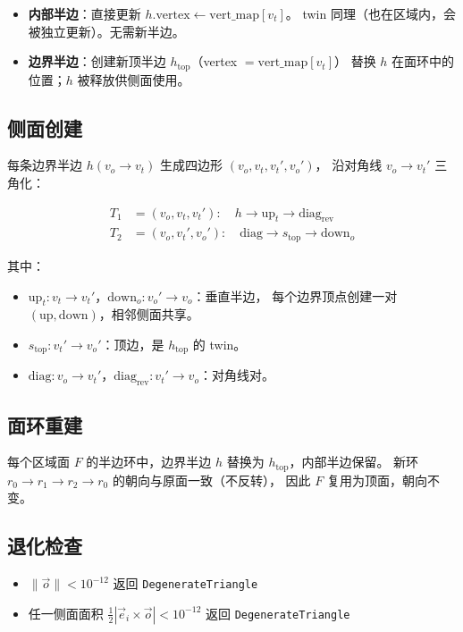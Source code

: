 \documentclass[11pt,a4paper]{article}
\begin{document}
\begin{itemize}
  \item \textbf{内部半边}：直接更新 $h.\text{vertex} \leftarrow \text{vert\_map}[v_t]$。
        twin 同理（也在区域内，会被独立更新）。无需新半边。
  \item \textbf{边界半边}：创建新顶半边 $h_{\text{top}}$（vertex $= \text{vert\_map}[v_t]$）
        替换 $h$ 在面环中的位置；$h$ 被释放供侧面使用。
\end{itemize}

\subsection{侧面创建}

每条边界半边 $h(v_o \to v_t)$ 生成四边形 $(v_o, v_t, v_t', v_o')$，
沿对角线 $v_o \to v_t'$ 三角化：

\begin{align*}
  T_1 &= (v_o, v_t, v_t'):\quad h \to \text{up}_t \to \text{diag}_{\text{rev}} \\
  T_2 &= (v_o, v_t', v_o'):\quad \text{diag} \to s_{\text{top}} \to \text{down}_o
\end{align*}

其中：
\begin{itemize}
  \item $\text{up}_t: v_t \to v_t'$，$\text{down}_o: v_o' \to v_o$：垂直半边，
        每个边界顶点创建一对 $(\text{up}, \text{down})$，相邻侧面共享。
  \item $s_{\text{top}}: v_t' \to v_o'$：顶边，是 $h_{\text{top}}$ 的 twin。
  \item $\text{diag}: v_o \to v_t'$，$\text{diag}_{\text{rev}}: v_t' \to v_o$：对角线对。
\end{itemize}

\subsection{面环重建}

每个区域面 $F$ 的半边环中，边界半边 $h$ 替换为 $h_{\text{top}}$，内部半边保留。
新环 $r_0 \to r_1 \to r_2 \to r_0$ 的朝向与原面一致（不反转），
因此 $F$ 复用为顶面，朝向不变。

\subsection{退化检查}

\begin{itemize}
  \item $\|\vec{o}\| < 10^{-12}$ 返回 \texttt{DegenerateTriangle}
  \item 任一侧面面积 $\frac{1}{2}|\vec{e}_i \times \vec{o}| < 10^{-12}$ 返回 \texttt{DegenerateTriangle}
\end{itemize}
\end{document}
